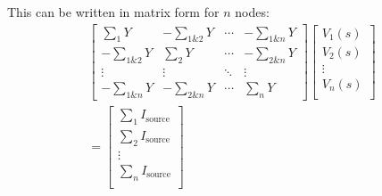 \documentclass[10pt, twocolumn]{article}
\begin{document}
This can be written in matrix form for \(n\) nodes:
\begin{multline*}
  \begin{bmatrix}
    \sum_1 {Y}       & - \sum_{1\&2}{Y} & \cdots & - \sum_{1\&n}{Y} \\
    - \sum_{1\&2}{Y} & \sum_2 {Y}       & \cdots & - \sum_{2\&n}{Y} \\
    \vdots           & \vdots           & \ddots & \vdots           \\
    - \sum_{1\&n}{Y} & -\sum_{2\&n}{Y}  & \cdots & \sum_n{Y}
  \end{bmatrix}
  \begin{bmatrix}
    V_1(s) \\
    V_2(s) \\
    \vdots \\
    V_n(s) \\
  \end{bmatrix} \\
  =
  \begin{bmatrix}
    \sum_1{I_\text{source}} \\
    \sum_2{I_\text{source}} \\
    \vdots                  \\
    \sum_n{I_\text{source}} \\
  \end{bmatrix}
\end{multline*}
\end{document}
